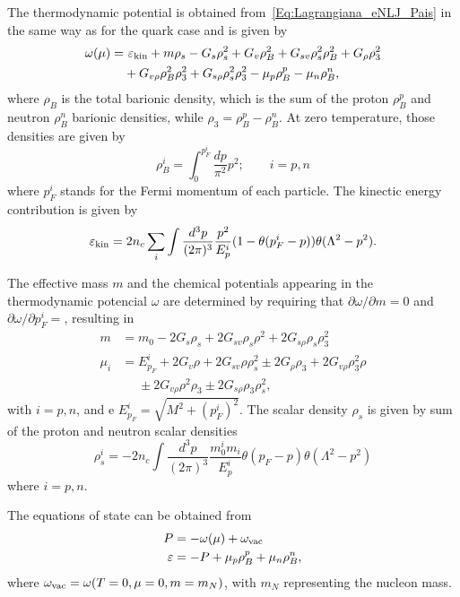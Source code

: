 \documentclass[prc, reprint, amsmath, floatfix,10pt]{revtex4-1}
\begin{document}
The thermodynamic potential is obtained from~\eqref{Eq:Lagrangiana_eNLJ_Pais} in the same way as for the quark case and is given by
\begin{equation}\label{Eq:potencial_termodinamico}
\begin{split}
	\omega(\mu) =&~ \varepsilon_{\rm{kin}} + m\rho_s - G_s\rho_s^2 + G_v\rho_B^2 + G_{sv}\rho_s^2\rho_B^2 + G_\rho\rho_3^2 \\
	&+ G_{v\rho}\rho_B^2\rho_3^2 + G_{s\rho}\rho_s^2\rho_3^2 - \mu_p\rho_B^p - \mu_n\rho_B^n,
\end{split}
\end{equation}
%
where $\rho_B$ is the total barionic density, which is the sum of the proton $\rho_B^p$ and neutron $\rho_B^n$ barionic densities, while $\rho_3 = \rho_B^p - \rho_B^n$. At zero temperature, those densities are given by
\begin{equation}
	\rho_B^i = \int_0^{p_F^i}\frac{dp}{\pi^2}p^2; \qquad i = p,n
\end{equation}
%
where $p_F^i$ stands for the Fermi momentum of each particle. The kinectic energy contribution is given by
\begin{equation}
	\varepsilon_{\rm{kin}} = 2 n_c \sum_i \int \frac{d^3p}{(2\pi)^3}\frac{p^2}{E_p^i}(1 - \theta(p_F^i - p))\theta(\Lambda^2 - p^2).
\end{equation}

The effective mass $m$ and the chemical potentials appearing in the thermodynamic potencial $\omega$ are determined by requiring that $\partial\omega/\partial m = 0$ and $\partial\omega/\partial p_F^i = $, resulting in
\begin{align}\label{Eq:Gap}
	m &= m_0 - 2G_s\rho_s + 2G_{sv}\rho_s\rho^2 + 2 G_{s\rho}\rho_s\rho_3^2 \\
	\mu_i &= E_{p_F}^i + 2G_v\rho + 2G_{sv}\rho\rho_s^2 \pm 2G_\rho\rho_3+2G_{v\rho}\rho_3^2\rho \nonumber \\
	&\phantom{=} \pm 2G_{v\rho}\rho^2\rho_3 \pm 2 G_{s\rho}\rho_3\rho_s^2,
\end{align}
%
with $i = p,n$, and e $E_{p_F}^i = \sqrt{M^2 + (p_F^i)^2}$. The scalar density $\rho_s$ is given by sum of the proton and neutron scalar densities
\begin{equation}
	\rho_s^i = - 2 n_c \int \frac{d^3p}{(2\pi)^3}\frac{m_0^i m_i}{E_p^i}\theta(p_F - p)\theta(\Lambda^2 - p^2)
\end{equation}
%
where $i = p, n$.

The equations of state can be obtained from
\begin{align}
	P &= -\omega(\mu) + \omega_{\rm{vac}} \\
	\varepsilon &= -P + \mu_p \rho_B^p + \mu_n \rho_B^n,
\end{align}
%
where $\omega_{\rm{vac}} = \omega(T = 0, \mu = 0, m = m_N)$, with $m_N$ representing the nucleon mass. 
\end{document}
